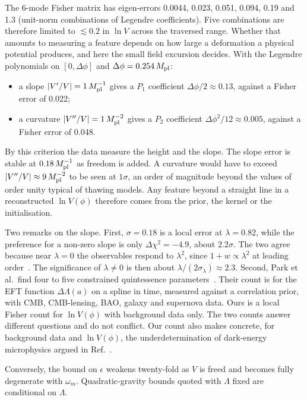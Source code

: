 \documentclass[11pt,a4paper]{article}
\newcommand{\Mpl}{M_{\rm pl}}
\begin{document}
The 6-mode Fisher matrix has eigen-errors 0.0044, 0.023, 0.051, 0.094, 0.19 and 1.3 (unit-norm combinations of Legendre coefficients). Five combinations are therefore limited to $\lesssim0.2$ in $\ln V$ across the traversed range. Whether that amounts to measuring a feature depends on how large a deformation a physical potential produces, and here the small field excursion decides. With the Legendre polynomials on $[0,\Delta\phi]$ and $\Delta\phi=0.254\,\Mpl$:
\begin{itemize}
\item a slope $|V'/V|=1\,\Mpl^{-1}$ gives a $P_1$ coefficient $\Delta\phi/2\approx0.13$, against a Fisher error of 0.022;
\item a curvature $|V''/V|=1\,\Mpl^{-2}$ gives a $P_2$ coefficient $\Delta\phi^2/12\approx0.005$, against a Fisher error of 0.048.
\end{itemize}
By this criterion the data measure the height and the slope. The slope error is stable at $0.18\,\Mpl^{-1}$ as freedom is added. A curvature would have to exceed $|V''/V|\approx9\,\Mpl^{-2}$ to be seen at $1\sigma$, an order of magnitude beyond the values of order unity typical of thawing models. Any feature beyond a straight line in a reconstructed $\ln V(\phi)$ therefore comes from the prior, the kernel or the initialisation.

Two remarks on the slope. First, $\sigma=0.18$ is a local error at $\lambda=0.82$, while the preference for a non-zero slope is only $\Delta\chi^2=-4.9$, about $2.2\sigma$. The two agree because near $\lambda=0$ the observables respond to $\lambda^2$, since $1+w\propto\lambda^2$ at leading order~\cite{2608.13488}. The significance of $\lambda\neq0$ is then about $\lambda/(2\sigma_\lambda)\approx2.3$.
Second, Park et al.\ find four to five constrained quintessence parameters~\cite{2101.04666}. Their count is for the EFT function $\Delta\Lambda(a)$ on a spline in time, measured against a correlation prior, with CMB, CMB-lensing, BAO, galaxy and supernova data. Ours is a local Fisher count for $\ln V(\phi)$ with background data only. The two counts answer different questions and do not conflict. Our count also makes concrete, for background data and $\ln V(\phi)$, the underdetermination of dark-energy microphysics argued in Ref.~\cite{2310.07482}.

Conversely, the bound on $\epsilon$ weakens twenty-fold as $V$ is freed and becomes fully degenerate with $\omega_m$. Quadratic-gravity bounds quoted with $\Lambda$ fixed are conditional on $\Lambda$.
\end{document}
